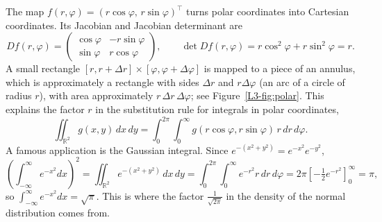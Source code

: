 \begin{example}\label{L3-ex:polar}
    The map $f(r, \varphi) = (r\cos\varphi, \, r\sin\varphi)^\top$ turns polar coordinates into Cartesian coordinates. Its Jacobian and Jacobian determinant are
    \[Df(r, \varphi) = \begin{pmatrix} \cos\varphi & -r\sin\varphi \\ \sin\varphi & r\cos\varphi \end{pmatrix}, \qquad \det Df(r, \varphi) = r\cos^2\varphi + r\sin^2\varphi = r.\]
    A small rectangle $[r, r + \Delta r] \times [\varphi, \varphi + \Delta\varphi]$ is mapped to a piece of an annulus, which is approximately a rectangle with sides $\Delta r$ and $r\Delta\varphi$ (an arc of a circle of radius $r$), with area approximately $r \, \Delta r \, \Delta\varphi$; see Figure~\ref{L3-fig:polar}. This explains the factor $r$ in the substitution rule for integrals in polar coordinates,
    \[\iint_{\mathbb{R}^2} g(x, y) \, dx \, dy = \int_0^{2\pi} \int_0^\infty g(r\cos\varphi, r\sin\varphi) \, r \, dr \, d\varphi.\]
    A famous application is the Gaussian integral. Since $e^{-(x^2 + y^2)} = e^{-x^2} e^{-y^2}$,
    \[\left(\int_{-\infty}^\infty e^{-x^2} dx\right)^2 = \iint_{\mathbb{R}^2} e^{-(x^2 + y^2)} \, dx \, dy = \int_0^{2\pi} \int_0^\infty e^{-r^2} r \, dr \, d\varphi = 2\pi \left[-\tfrac{1}{2} e^{-r^2}\right]_0^\infty = \pi,\]
    so $\int_{-\infty}^\infty e^{-x^2} dx = \sqrt{\pi}$. This is where the factor $\frac{1}{\sqrt{2\pi}}$ in the density of the normal distribution comes from.
\end{example}


